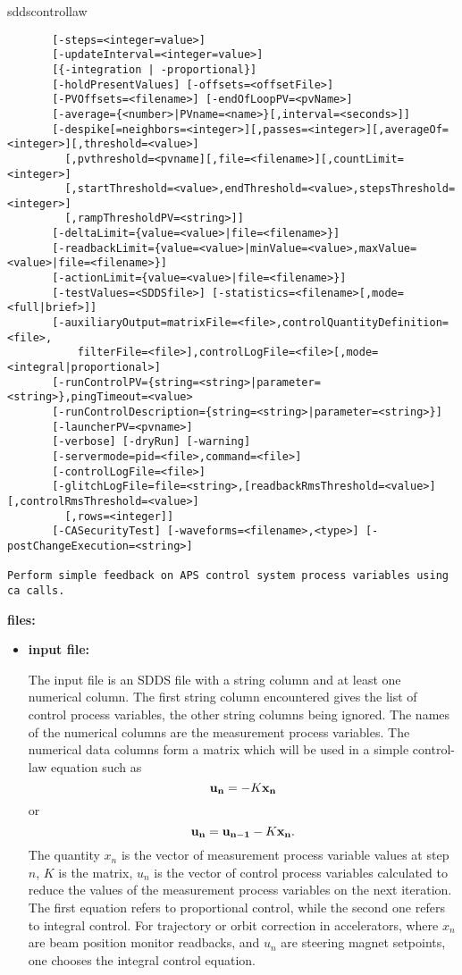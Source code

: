 \begin{sddsprog}{sddscontrollaw}
\begin{verbatim}
       [-steps=<integer=value>]
       [-updateInterval=<integer=value>]
       [{-integration | -proportional}]
       [-holdPresentValues] [-offsets=<offsetFile>]
       [-PVOffsets=<filename>] [-endOfLoopPV=<pvName>]
       [-average={<number>|PVname=<name>}[,interval=<seconds>]]
       [-despike[=neighbors=<integer>][,passes=<integer>][,averageOf=<integer>][,threshold=<value>]
         [,pvthreshold=<pvname][,file=<filename>][,countLimit=<integer>]
         [,startThreshold=<value>,endThreshold=<value>,stepsThreshold=<integer>]
         [,rampThresholdPV=<string>]]
       [-deltaLimit={value=<value>|file=<filename>}]
       [-readbackLimit={value=<value>|minValue=<value>,maxValue=<value>|file=<filename>}]
       [-actionLimit={value=<value>|file=<filename>}]
       [-testValues=<SDDSfile>] [-statistics=<filename>[,mode=<full|brief>]]
       [-auxiliaryOutput=matrixFile=<file>,controlQuantityDefinition=<file>,
           filterFile=<file>],controlLogFile=<file>[,mode=<integral|proportional>]
       [-runControlPV={string=<string>|parameter=<string>},pingTimeout=<value>
       [-runControlDescription={string=<string>|parameter=<string>}]
       [-launcherPV=<pvname>]
       [-verbose] [-dryRun] [-warning]
       [-servermode=pid=<file>,command=<file>]
       [-controlLogFile=<file>]
       [-glitchLogFile=file=<string>,[readbackRmsThreshold=<value>][,controlRmsThreshold=<value>]
         [,rows=<integer]]
       [-CASecurityTest] [-waveforms=<filename>,<type>] [-postChangeExecution=<string>]

Perform simple feedback on APS control system process variables using ca calls.
\end{verbatim}
\item \textbf{files:}
\begin{itemize}
  \item \textbf{input file:} \par
The input file is an SDDS file with a string column and at least one numerical column.
The first string column encountered gives the list of
control process variables, the other string columns being ignored.
The names of the numerical columns are the measurement process variables.
The numerical data columns form a matrix which will be used in a simple
control-law equation such as
\begin{equation}
{\bf u_n} = - K {\bf x_n}
\end{equation}
or
\begin{equation}
{\bf u_n} = {\bf u_{n-1}} - K {\bf x_n}.
\end{equation}
The quantity $x_n$ is the vector of measurement process variable
values at step $n$, $K$ is the matrix, $u_n$ is the vector of control
process variables calculated to reduce the values of the measurement
process variables on the next iteration.  The first equation refers to
proportional control, while the second one refers to integral
control. For trajectory or orbit correction in accelerators, where
$x_n$ are beam position monitor readbacks, and $u_n$ are steering
magnet setpoints, one chooses the integral control equation.


\end{itemize}
\end{sddsprog}
